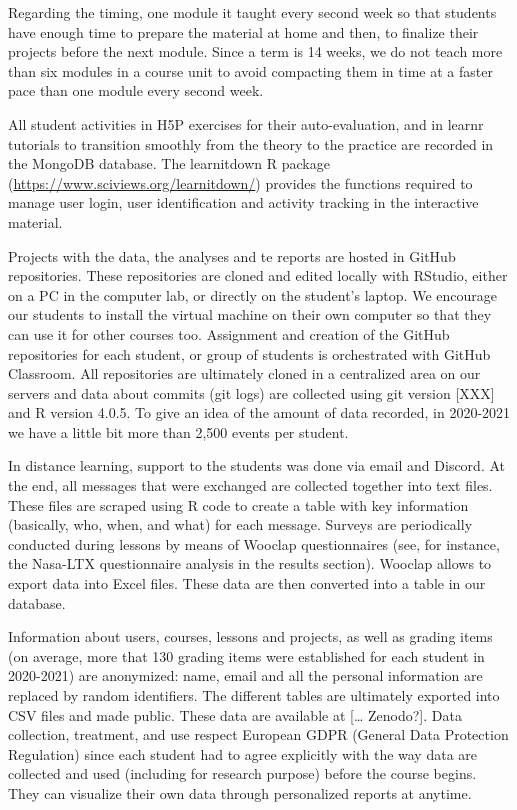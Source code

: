 \documentclass[
]{article}
\begin{document}
Regarding the timing, one module it taught every second week so that
students have enough time to prepare the material at home and then, to
finalize their projects before the next module. Since a term is 14
weeks, we do not teach more than six modules in a course unit to avoid
compacting them in time at a faster pace than one module every second
week.

All student activities in H5P exercises for their auto-evaluation, and
in learnr tutorials to transition smoothly from the theory to the
practice are recorded in the MongoDB database. The learnitdown R package
(\url{https://www.sciviews.org/learnitdown/}) provides the functions
required to manage user login, user identification and activity tracking
in the interactive material.

Projects with the data, the analyses and te reports are hosted in GitHub
repositories. These repositories are cloned and edited locally with
RStudio, either on a PC in the computer lab, or directly on the
student's laptop. We encourage our students to install the virtual
machine on their own computer so that they can use it for other courses
too. Assignment and creation of the GitHub repositories for each
student, or group of students is orchestrated with GitHub Classroom. All
repositories are ultimately cloned in a centralized area on our servers
and data about commits (git logs) are collected using git version
{[}XXX{]} and R version 4.0.5. To give an idea of the amount of data
recorded, in 2020-2021 we have a little bit more than 2,500 events per
student.

In distance learning, support to the students was done via email and
Discord. At the end, all messages that were exchanged are collected
together into text files. These files are scraped using R code to create
a table with key information (basically, who, when, and what) for each
message. Surveys are periodically conducted during lessons by means of
Wooclap questionnaires (see, for instance, the Nasa-LTX questionnaire
analysis in the results section). Wooclap allows to export data into
Excel files. These data are then converted into a table in our database.

Information about users, courses, lessons and projects, as well as
grading items (on average, more that 130 grading items were established
for each student in 2020-2021) are anonymized: name, email and all the
personal information are replaced by random identifiers. The different
tables are ultimately exported into CSV files and made public. These
data are available at {[}\ldots{} Zenodo?{]}. Data collection,
treatment, and use respect European GDPR (General Data Protection
Regulation) since each student had to agree explicitly with the way data
are collected and used (including for research purpose) before the
course begins. They can visualize their own data through personalized
reports at anytime.
\end{document}
